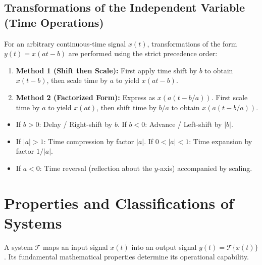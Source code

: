\documentclass[12pt,a4paper]{article}
\begin{document}
\subsection{Transformations of the Independent Variable (Time Operations)}
For an arbitrary continuous-time signal $x(t)$, transformations of the form $y(t) = x(at - b)$ are performed using the strict precedence order:
\begin{enumerate}[label=\arabic*., leftmargin=*]
  \item \textbf{Method 1 (Shift then Scale):} First apply time shift by $b$ to obtain $x(t - b)$, then scale time by $a$ to yield $x(at - b)$.
  \item \textbf{Method 2 (Factorized Form):} Express as $x(a(t - b/a))$. First scale time by $a$ to yield $x(at)$, then shift time by $b/a$ to obtain $x(a(t - b/a))$.
\end{enumerate}
\begin{itemize}[leftmargin=*, itemsep=2pt]
  \item If $b > 0$: Delay / Right-shift by $b$. If $b < 0$: Advance / Left-shift by $|b|$.
  \item If $|a| > 1$: Time compression by factor $|a|$. If $0 < |a| < 1$: Time expansion by factor $1/|a|$.
  \item If $a < 0$: Time reversal (reflection about the $y$-axis) accompanied by scaling.
\end{itemize}

\section{Properties and Classifications of Systems}

A system $\mathcal{T}$ maps an input signal $x(t)$ into an output signal $y(t) = \mathcal{T}\{x(t)\}$. Its fundamental mathematical properties determine its operational capability.
\end{document}
